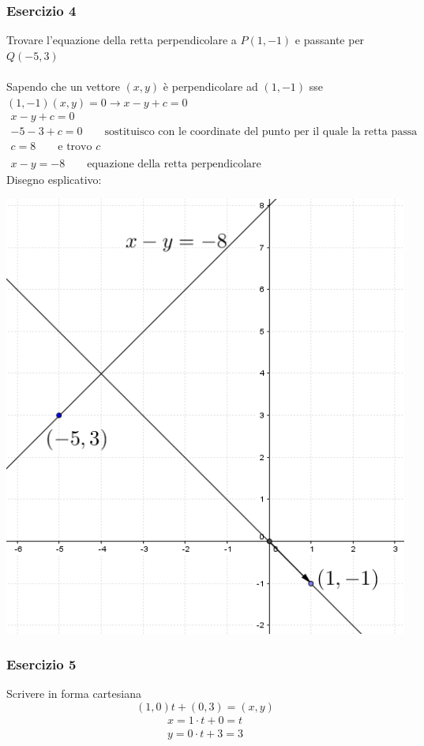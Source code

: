 \documentclass[italian]{article}
\begin{document}
\subsubsection{Esercizio 4}
Trovare l'equazione della retta perpendicolare a $P(1,-1)$ e passante per $Q(-5,3)$\\\\
Sapendo che un vettore $(x,y)$ è perpendicolare ad $(1,-1)$ sse $(1,-1)(x,y)=0 \to x-y+c=0$
\begin{gather*}
	x-y+c = 0 \\
	-5 - 3 + c = 0 \qquad \text{sostituisco con le coordinate del punto per il quale la retta passa}\\
	c=8 \qquad \text{e trovo $c$}\\\\
	x-y=-8 \qquad \text{equazione della retta perpendicolare}
\end{gather*}
Disegno esplicativo:
\begin{center}
	\includegraphics[width=0.5\linewidth]{img/vettori_rette_perpendicolari.png}
\end{center}
\pagebreak
\subsubsection{Esercizio 5}
Scrivere in forma cartesiana
\[
	(1,0)t + (0,3) = (x,y)
\]
\begin{gather*}
	x = 1\cdot t + 0 = t\\
	y = 0\cdot t + 3 = 3
\end{gather*}
\end{document}
